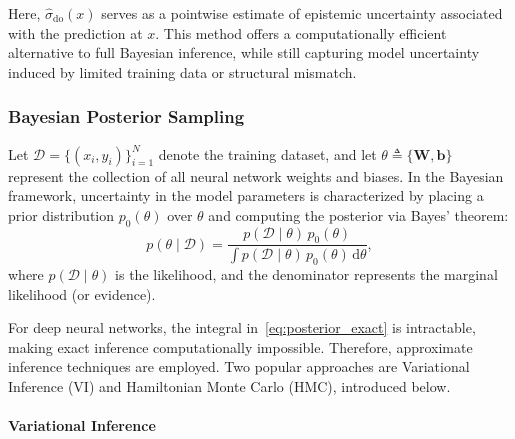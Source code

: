 \documentclass[preprint,12pt]{elsarticle}
\begin{document}
Here, $\hat{\sigma}_{\mathrm{do}}(x)$ serves as a pointwise estimate of epistemic uncertainty associated with the prediction at $x$. This method offers a computationally efficient alternative to full Bayesian inference, while still capturing model uncertainty induced by limited training data or structural mismatch.

\subsubsection{Bayesian Posterior Sampling}
\label{sec:sub:bayesian_posterior_sampling}

Let $\mathcal{D} = \{(x_i, y_i)\}_{i=1}^{N}$ denote the training dataset, and let $\theta \triangleq \{\mathbf{W}, \mathbf{b}\}$ represent the collection of all neural network weights and biases. In the Bayesian framework, uncertainty in the model parameters is characterized by placing a prior distribution $p_0(\theta)$ over $\theta$ and computing the posterior via Bayes’ theorem:
\begin{equation}
p(\theta \mid \mathcal{D}) = \frac{p(\mathcal{D} \mid \theta)\, p_0(\theta)}{\int p(\mathcal{D} \mid \theta)\, p_0(\theta)\, \mathrm{d}\theta},
\label{eq:posterior_exact}
\end{equation}
where $p(\mathcal{D} \mid \theta)$ is the likelihood, and the denominator represents the marginal likelihood (or evidence).

For deep neural networks, the integral in~\eqref{eq:posterior_exact} is intractable, making exact inference computationally impossible. Therefore, approximate inference techniques are employed. Two popular approaches are Variational Inference (VI) and Hamiltonian Monte Carlo (HMC), introduced below.


\paragraph{Variational Inference}
\label{par:bayesian_posterior_sampling}
\end{document}
